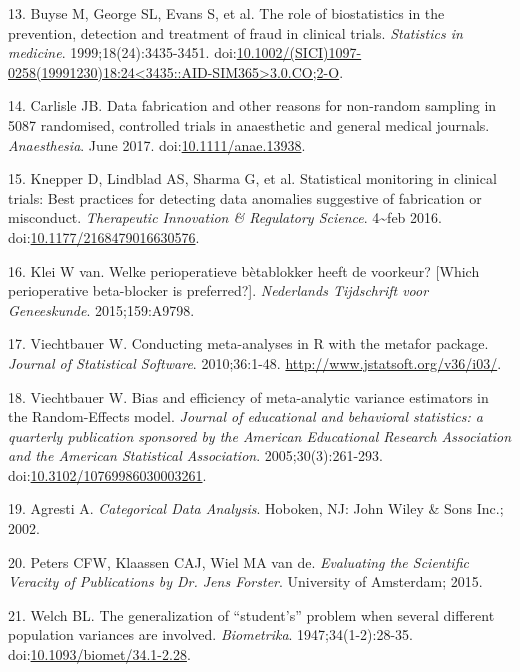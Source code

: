 \documentclass[]{article}
\begin{document}
\hypertarget{ref-Buyse1999-jq}{}
13. Buyse M, George SL, Evans S, et al. The role of biostatistics in the
prevention, detection and treatment of fraud in clinical trials.
\emph{Statistics in medicine}. 1999;18(24):3435-3451.
doi:\href{https://doi.org/10.1002/(SICI)1097-0258(19991230)18:24\%3C3435::AID-SIM365\%3E3.0.CO;2-O}{10.1002/(SICI)1097-0258(19991230)18:24\textless{}3435::AID-SIM365\textgreater{}3.0.CO;2-O}.

\hypertarget{ref-10.1111ux2fanae.13938}{}
14. Carlisle JB. Data fabrication and other reasons for non-random
sampling in 5087 randomised, controlled trials in anaesthetic and
general medical journals. \emph{Anaesthesia}. June 2017.
doi:\href{https://doi.org/10.1111/anae.13938}{10.1111/anae.13938}.

\hypertarget{ref-Knepper2016-la}{}
15. Knepper D, Lindblad AS, Sharma G, et al. Statistical monitoring in
clinical trials: Best practices for detecting data anomalies suggestive
of fabrication or misconduct. \emph{Therapeutic Innovation \& Regulatory
Science}. 4\textasciitilde{}feb 2016.
doi:\href{https://doi.org/10.1177/2168479016630576}{10.1177/2168479016630576}.

\hypertarget{ref-klei2015}{}
16. Klei W van. Welke perioperatieve bètablokker heeft de voorkeur?
{[}Which perioperative beta-blocker is preferred?{]}. \emph{Nederlands
Tijdschrift voor Geneeskunde}. 2015;159:A9798.

\hypertarget{ref-viechtbauer2010}{}
17. Viechtbauer W. Conducting meta-analyses in R with the metafor
package. \emph{Journal of Statistical Software}. 2010;36:1-48.
\url{http://www.jstatsoft.org/v36/i03/}.

\hypertarget{ref-viechtbauer2005}{}
18. Viechtbauer W. Bias and efficiency of meta-analytic variance
estimators in the Random-Effects model. \emph{Journal of educational and
behavioral statistics: a quarterly publication sponsored by the American
Educational Research Association and the American Statistical
Association}. 2005;30(3):261-293.
doi:\href{https://doi.org/10.3102/10769986030003261}{10.3102/10769986030003261}.

\hypertarget{ref-agresti2002}{}
19. Agresti A. \emph{Categorical Data Analysis}. Hoboken, NJ: John Wiley
\& Sons Inc.; 2002.

\hypertarget{ref-peters2015}{}
20. Peters CFW, Klaassen CAJ, Wiel MA van de. \emph{Evaluating the
Scientific Veracity of Publications by Dr. Jens Forster}. University of
Amsterdam; 2015.

\hypertarget{ref-doi:10.1093ux2fbiometux2f34.1-2.28}{}
21. Welch BL. The generalization of ``student's'' problem when several
different population variances are involved. \emph{Biometrika}.
1947;34(1-2):28-35.
doi:\href{https://doi.org/10.1093/biomet/34.1-2.28}{10.1093/biomet/34.1-2.28}.
\end{document}
